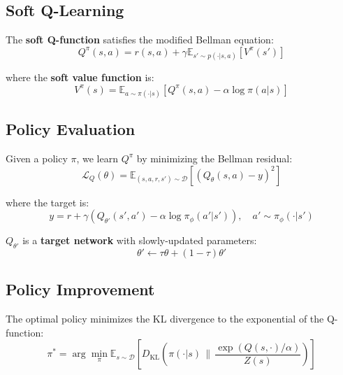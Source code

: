 \documentclass[11pt,a4paper]{report}
\begin{document}
\subsection{Soft Q-Learning}

The \textbf{soft Q-function} satisfies the modified Bellman equation:
\begin{equation}
    Q^\pi(s,a) = r(s,a) + \gamma \mathbb{E}_{s' \sim p(\cdot|s,a)}\left[ V^\pi(s') \right]
\end{equation}

where the \textbf{soft value function} is:
\begin{equation}
    V^\pi(s) = \mathbb{E}_{a \sim \pi(\cdot|s)}\left[ Q^\pi(s,a) - \alpha \log \pi(a|s) \right]
\end{equation}

\subsection{Policy Evaluation}

Given a policy $\pi$, we learn $Q^\pi$ by minimizing the Bellman residual:
\begin{equation}
    \mathcal{L}_Q(\theta) = \mathbb{E}_{(s,a,r,s') \sim \mathcal{D}}\left[ \left( Q_\theta(s,a) - y \right)^2 \right]
\end{equation}

where the target is:
\begin{equation}
    y = r + \gamma \left( Q_{\theta'}(s', a') - \alpha \log \pi_\phi(a'|s') \right), \quad a' \sim \pi_\phi(\cdot|s')
\end{equation}

$Q_{\theta'}$ is a \textbf{target network} with slowly-updated parameters:
\begin{equation}
    \theta' \leftarrow \tau \theta + (1-\tau) \theta'
\end{equation}

\subsection{Policy Improvement}

The optimal policy minimizes the KL divergence to the exponential of the Q-function:
\begin{equation}
    \pi^* = \arg\min_{\pi} \mathbb{E}_{s \sim \mathcal{D}}\left[ D_{\text{KL}}\left( \pi(\cdot|s) \,\|\, \frac{\exp(Q(s,\cdot)/\alpha)}{Z(s)} \right) \right]
\end{equation}
\end{document}
